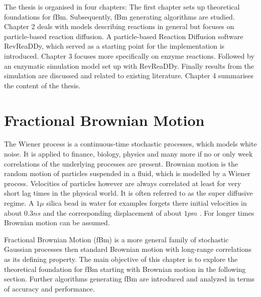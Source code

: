 \documentclass[
  a4paper,BCOR10mm,oneside,
  headsepline,footsepline,%
  fleqn,openbib
]{scrbook}
\begin{document}
\par The thesis is organised in four chapters: The first chapter sets up theoretical foundations for fBm. Subsequently, fBm generating algorithms are studied. Chapter 2 deals with models describing reactions in general but focuses on particle-based reaction diffusion. A particle-based Reaction Diffusion software RevReaDDy, which served as a starting point for the implementation is introduced.  Chapter 3 focuses more specifically on enzyme reactions. Followed by an enzymatic simulation model set up with RevReaDDy. Finally results from the simulation are discussed and related to existing literature. Chapter 4 summarises the content of the thesis. 
\chapter{Fractional Brownian Motion}
The Wiener process is a continuous-time stochastic processes, which models white noise. It is applied to finance, biology, physics and many more if no or only week correlations of the underlying processes are present. Brownian motion is the random motion of particles suspended in a fluid, which is modelled by a Wiener process. Velocities of particles however are always correlated at least for very short lag times in the physical world. It is often referred to as the super diffusive regime. A $1 \mu $  silica bead in water for examples forgets there initial velocities in about $0.3ns$ and the corresponding displacement of about $1pm$ \cite{Huang2011}. For longer times Brownian motion can be assumed.\par
Fractional Brownian Motion (fBm) is a more general family of stochastic Gaussian processes then standard Brownian motion with long-range correlations as its defining property. The main objective of this chapter is to explore the theoretical foundation for fBm starting with Brownian motion in the following section. Further algorithms generating fBm are introduced and analyzed in terms of accuracy and performance.    
\end{document}
